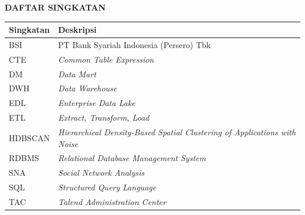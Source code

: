 \cleardoublepage
{}
\vspace{2cm}
\begin{center}
{\fontsize{14}{16.8}\selectfont\textbf{DAFTAR SINGKATAN}}\\[1em]
\end{center}
\label{chap:singkatan}
\vspace{2em}
\begin{longtable}{@{} l >{\raggedright\arraybackslash}p{9.5cm} @{}}
\textbf{Singkatan} & \textbf{Deskripsi} \\
\hline
BSI & PT Bank Syariah Indonesia (Persero) Tbk \\
CTE & \textit{Common Table Expression} \\
DM & \textit{Data Mart} \\
DWH & \textit{Data Warehouse} \\
EDL & \textit{Enterprise Data Lake} \\
ETL & \textit{Extract, Transform, Load} \\
HDBSCAN & \textit{Hierarchical Density-Based Spatial Clustering of Applications with Noise} \\
RDBMS & \textit{Relational Database Management System} \\
SNA & \textit{Social Network Analysis} \\
SQL & \textit{Structured Query Language} \\
TAC & \textit{Talend Administration Center} \\
\end{longtable}
